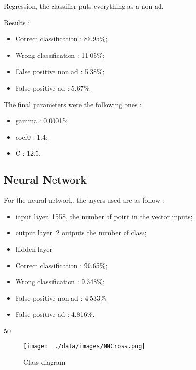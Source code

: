 Regression, the classifier puts everything as a non ad.

Results :
\begin{itemize}
  \item Correct classification : 88.95\%;
  \item Wrong classification : 11.05\%;
  \item False positive non ad : 5.38\%;
  \item False positive ad : 5.67\%.
\end{itemize}

The final parameters were the following ones :
\begin{itemize}
  \item gamma : 0.00015;
  \item coef0 : 1.4;
  \item C : 12.5.
\end{itemize}

\subsection{Neural Network}
For the neural network, the layers used are as follow :
  \begin{itemize}
    \item input layer, 1558, the number of point in the vector inputs;
    \item output layer, 2 outputs the number of class;
    \item hidden layer;
  \end{itemize}

  \begin{itemize}
    \item Correct classification : 90.65\%;
    \item Wrong classification : 9.348\%;
    \item False positive non ad : 4.533\%;
    \item False positive ad : 4.816\%.
  \end{itemize}

50
  \begin{figure}[h]
   \centering
   \texttt{[image: ../data/images/NNCross.png]}
   \caption{Class diagram}
  \end{figure}
